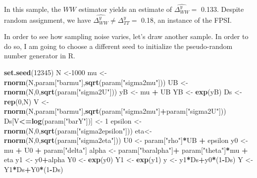 \documentclass[]{book}
\newenvironment{Shaded}{\begin{snugshade}}{\end{snugshade}}
\newcommand{\DecValTok}[1]{\textcolor[rgb]{0.00,0.00,0.81}{#1}}
\newcommand{\KeywordTok}[1]{\textcolor[rgb]{0.13,0.29,0.53}{\textbf{#1}}}
\newcommand{\NormalTok}[1]{#1}
\newcommand{\OperatorTok}[1]{\textcolor[rgb]{0.81,0.36,0.00}{\textbf{#1}}}
\newcommand{\StringTok}[1]{\textcolor[rgb]{0.31,0.60,0.02}{#1}}
\theoremstyle{definition}
\theoremstyle{definition}
\theoremstyle{definition}
\theoremstyle{remark}
\begin{document}
In this sample, the \(WW\) estimator yields an estimate of \(\hat{\Delta^y_{WW}}=\) 0.133.
Despite random assignment, we have \(\hat{\Delta^y_{WW}}\neq\Delta^y_{TT}=\) 0.18, an instance of the FPSI.

In order to see how sampling noise varies, let's draw another sample.
In order to do so, I am going to choose a different seed to initialize the pseudo-random number generator in R.

\begin{Shaded}
\begin{Highlighting}[]
\KeywordTok{set.seed}\NormalTok{(}\DecValTok{12345}\NormalTok{)}
\NormalTok{N <-}\DecValTok{1000}
\NormalTok{mu <-}\StringTok{ }\KeywordTok{rnorm}\NormalTok{(N,param[}\StringTok{"barmu"}\NormalTok{],}\KeywordTok{sqrt}\NormalTok{(param[}\StringTok{"sigma2mu"}\NormalTok{]))}
\NormalTok{UB <-}\StringTok{ }\KeywordTok{rnorm}\NormalTok{(N,}\DecValTok{0}\NormalTok{,}\KeywordTok{sqrt}\NormalTok{(param[}\StringTok{"sigma2U"}\NormalTok{]))}
\NormalTok{yB <-}\StringTok{ }\NormalTok{mu }\OperatorTok{+}\StringTok{ }\NormalTok{UB }
\NormalTok{YB <-}\StringTok{ }\KeywordTok{exp}\NormalTok{(yB)}
\NormalTok{Ds <-}\StringTok{ }\KeywordTok{rep}\NormalTok{(}\DecValTok{0}\NormalTok{,N)}
\NormalTok{V <-}\StringTok{ }\KeywordTok{rnorm}\NormalTok{(N,param[}\StringTok{"barmu"}\NormalTok{],}\KeywordTok{sqrt}\NormalTok{(param[}\StringTok{"sigma2mu"}\NormalTok{]}\OperatorTok{+}\NormalTok{param[}\StringTok{"sigma2U"}\NormalTok{]))}
\NormalTok{Ds[V}\OperatorTok{<=}\KeywordTok{log}\NormalTok{(param[}\StringTok{"barY"}\NormalTok{])] <-}\StringTok{ }\DecValTok{1} 
\NormalTok{epsilon <-}\StringTok{ }\KeywordTok{rnorm}\NormalTok{(N,}\DecValTok{0}\NormalTok{,}\KeywordTok{sqrt}\NormalTok{(param[}\StringTok{"sigma2epsilon"}\NormalTok{]))}
\NormalTok{eta<-}\StringTok{ }\KeywordTok{rnorm}\NormalTok{(N,}\DecValTok{0}\NormalTok{,}\KeywordTok{sqrt}\NormalTok{(param[}\StringTok{"sigma2eta"}\NormalTok{]))}
\NormalTok{U0 <-}\StringTok{ }\NormalTok{param[}\StringTok{"rho"}\NormalTok{]}\OperatorTok{*}\NormalTok{UB }\OperatorTok{+}\StringTok{ }\NormalTok{epsilon}
\NormalTok{y0 <-}\StringTok{ }\NormalTok{mu }\OperatorTok{+}\StringTok{  }\NormalTok{U0 }\OperatorTok{+}\StringTok{ }\NormalTok{param[}\StringTok{"delta"}\NormalTok{]}
\NormalTok{alpha <-}\StringTok{ }\NormalTok{param[}\StringTok{"baralpha"}\NormalTok{]}\OperatorTok{+}\StringTok{  }\NormalTok{param[}\StringTok{"theta"}\NormalTok{]}\OperatorTok{*}\NormalTok{mu }\OperatorTok{+}\StringTok{ }\NormalTok{eta}
\NormalTok{y1 <-}\StringTok{ }\NormalTok{y0}\OperatorTok{+}\NormalTok{alpha}
\NormalTok{Y0 <-}\StringTok{ }\KeywordTok{exp}\NormalTok{(y0)}
\NormalTok{Y1 <-}\StringTok{ }\KeywordTok{exp}\NormalTok{(y1)}
\NormalTok{y <-}\StringTok{ }\NormalTok{y1}\OperatorTok{*}\NormalTok{Ds}\OperatorTok{+}\NormalTok{y0}\OperatorTok{*}\NormalTok{(}\DecValTok{1}\OperatorTok{-}\NormalTok{Ds)}
\NormalTok{Y <-}\StringTok{ }\NormalTok{Y1}\OperatorTok{*}\NormalTok{Ds}\OperatorTok{+}\NormalTok{Y0}\OperatorTok{*}\NormalTok{(}\DecValTok{1}\OperatorTok{-}\NormalTok{Ds)}
\end{Highlighting}
\end{Shaded}
\end{document}
